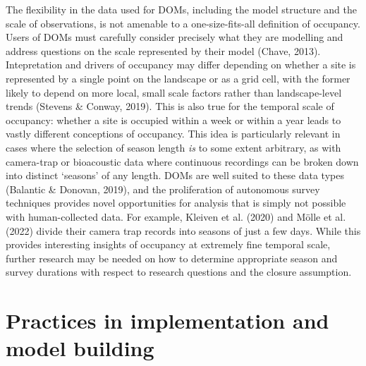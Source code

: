 \documentclass[
]{article}
\begin{document}
The flexibility in the data used for DOMs, including the model structure
and the scale of observations, is not amenable to a one-size-fits-all
definition of occupancy. Users of DOMs must carefully consider precisely
what they are modelling and address questions on the scale represented
by their model (Chave, 2013). Intepretation and drivers of occupancy may
differ depending on whether a site is represented by a single point on
the landscape or as a grid cell, with the former likely to depend on
more local, small scale factors rather than landscape-level trends
(Stevens \& Conway, 2019). This is also true for the temporal scale of
occupancy: whether a site is occupied within a week or within a year
leads to vastly different conceptions of occupancy. This idea is
particularly relevant in cases where the selection of season length
\emph{is} to some extent arbitrary, as with camera-trap or bioacoustic
data where continuous recordings can be broken down into distinct
`seasons' of any length. DOMs are well suited to these data types
(Balantic \& Donovan, 2019), and the proliferation of autonomous survey
techniques provides novel opportunities for analysis that is simply not
possible with human-collected data. For example, Kleiven et al. (2020)
and Mölle et al. (2022) divide their camera trap records into seasons of
just a few days. While this provides interesting insights of occupancy
at extremely fine temporal scale, further research may be needed on how
to determine appropriate season and survey durations with respect to
research questions and the closure assumption.

\section{Practices in implementation and model
building}\label{practices-in-implementation-and-model-building}
\end{document}
